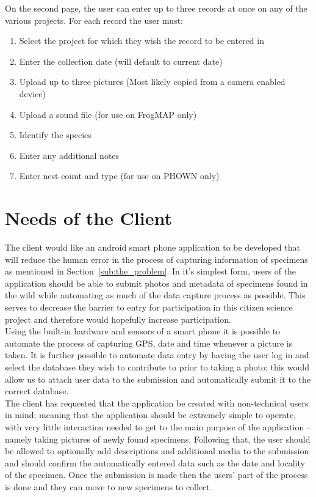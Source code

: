 \documentclass[
10pt, %
a4paper, %
oneside, %
headinclude,footinclude, %
BCOR5mm, %
]{scrartcl}
\begin{document}
On the second page, the user can enter up to three records at once on any of the various projects. For each record the user must:

\begin{enumerate}
\item Select the project for which they wish the record to be entered in
\item Enter the collection date (will default to current date)
\item Upload up to three pictures (Most likely copied from a camera enabled device)
\item Upload a sound file (for use on FrogMAP only)
\item Identify the species
\item Enter any additional notes
\item Enter nest count and type (for use on PHOWN only)
\end{enumerate}


\section{Needs of the Client} %
\label{sec:needs_of_the_client}

The client would like an android smart phone application to be developed that will reduce the human error in the process of capturing information of specimens as mentioned in Section~\vref{sub:the_problem}. In it's simplest form, users of the application should be able to submit photos and metadata of specimens found in the wild while automating as much of the data capture process as possible. This serves to decrease the barrier to entry for participation in this citizen science project and therefore would hopefully increase participation. \\

\noindent
Using the built-in hardware and sensors of a smart phone it is possible to automate the process of capturing GPS, date and time whenever a picture is taken. It is further possible to automate data entry by having the user log in and select the database they wish to contribute to prior to taking a photo; this would allow us to attach user data to the submission and automatically submit it to the correct database. \\

\noindent
The client has requested that the application be created with non-technical users in mind; meaning that the application should be extremely simple to operate, with very little interaction needed to get to the main purpose of the application -- namely taking pictures of newly found specimens. Following that, the user should be allowed to optionally add descriptions and additional media to the submission and should confirm the automatically entered data such as the date and locality of the specimen. Once the submission is made then the users' part of the process is done and they can move to new specimens to collect. \\
\end{document}
